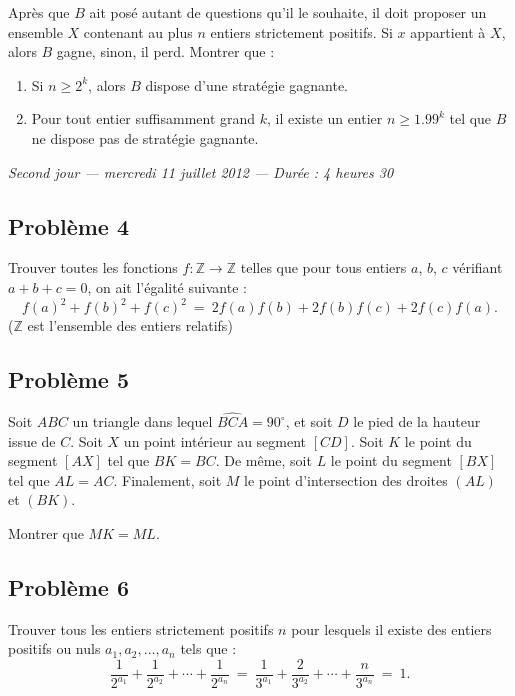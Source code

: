 Après que $B$ ait posé autant de questions qu'il le souhaite, il doit proposer un ensemble $X$ contenant au
plus $n$ entiers strictement positifs. Si $x$ appartient à $X$, alors $B$ gagne, sinon, il perd. Montrer que :
\begin{enumerate}
  \item Si $n \geq 2^k$, alors $B$ dispose d'une stratégie gagnante.
  \item Pour tout entier suffisamment grand $k$, il existe un entier $n \geq 1.99^k$ tel que $B$ ne dispose
  pas de stratégie gagnante.
\end{enumerate}

\bigskip
\begin{center}
  \emph{Second jour --- mercredi 11 juillet 2012 --- Durée : 4 heures 30}
\end{center}

\subsection*{Problème 4}
Trouver toutes les fonctions $f : \mathbb{Z} \to \mathbb{Z}$ telles que pour tous entiers $a$, $b$, $c$
vérifiant $a + b + c = 0$, on ait l'égalité suivante :
\[
f(a)^2 + f(b)^2 + f(c)^2 \ = \ 2f(a)f(b) + 2f(b)f(c) + 2f(c)f(a).
\]
($\mathbb{Z}$ est l'ensemble des entiers relatifs)

\subsection*{Problème 5}
Soit $ABC$ un triangle dans lequel $\widehat{BCA} = 90^\circ$, et soit $D$ le pied de la hauteur issue de
$C$. Soit $X$ un point intérieur au segment $[CD]$. Soit $K$ le point du segment $[AX]$ tel que $BK = BC$. De
même, soit $L$ le point du segment $[BX]$ tel que $AL = AC$. Finalement, soit $M$ le point d'intersection des
droites $(AL)$ et $(BK)$.

Montrer que $MK = ML$.

\subsection*{Problème 6}
Trouver tous les entiers strictement positifs $n$ pour lesquels il existe des entiers positifs ou nuls
$a_1, a_2, \ldots, a_n$ tels que :
\[
\frac{1}{2^{a_1}} + \frac{1}{2^{a_2}} + \cdots + \frac{1}{2^{a_n}} \ = \ \frac{1}{3^{a_1}} + \frac{2}{3^{a_2}} + \cdots + \frac{n}{3^{a_n}} \ = \ 1.
\]
